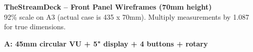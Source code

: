 \documentclass{article}
\begin{document}
\noindent
\begin{center}
{\fontsize{13}{16}\selectfont\bfseries TheStreamDeck -- Front Panel Wireframes (70mm height)}\\[1pt]
{\fontsize{8}{10}\selectfont\color{gray} 92\% scale on A3 (actual case is 435 x 70mm). Multiply measurements by 1.087 for true dimensions.}
\end{center}
\vspace{2mm}



\noindent
{\fontsize{9}{11}\selectfont\bfseries A: 45mm circular VU + 5" display + 4 buttons + rotary}

\vspace{1mm}
\end{document}
